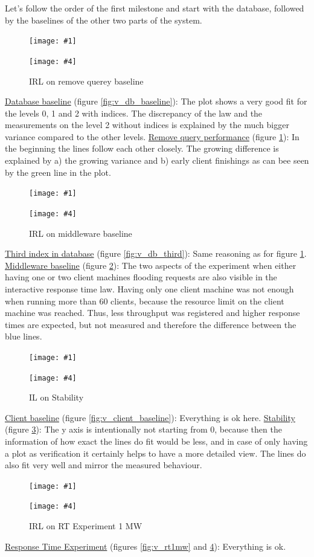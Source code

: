\documentclass[11pt]{article}
\newcommand\TwoFig[6]{%
	\sbox\IBoxA{\texttt{[image: \#1]}}
	\sbox\IBoxB{\texttt{[image: \#4]}}%
	\ifdim\ht\IBoxA>\ht\IBoxB
	\setlength\IHeight{\ht\IBoxB}\else\setlength\IHeight{\ht\IBoxA}\fi%
	\begin{figure}[!htb]
		\minipage[t]{0.5\textwidth}\centering
		\texttt{[image: \#1]}
		\caption{#2}\label{#3}
		\endminipage \hfill
		\minipage[t]{0.5\textwidth}\centering
		\texttt{[image: \#4]}
		\caption{#5}\label{#6}
		\endminipage
	\end{figure}%
}
\begin{document}
Let's follow the order of the first milestone and start with the database, followed by the baselines of the other two parts of the system.
\TwoFig {figures/interactive_law/db_baseline} {IRL on DB baseline} {fig:v_db_baseline}
{figures/interactive_law/db_data_baseline} {IRL on remove querey baseline} {fig:v_db_data}
\newline\underline{Database baseline} (figure \ref{fig:v_db_baseline}): The plot shows a very good fit for the levels 0, 1 and 2 with indices. The discrepancy of the law and the measurements on the level 2 without indices is explained by the much bigger variance compared to the other levels.
\newline\underline{Remove query performance} (figure \ref{fig:v_db_data}): In the beginning the lines follow each other closely. The growing difference is explained by a) the growing variance and b) early client finishings as can bee seen by the green line in the plot.
\TwoFig {figures/interactive_law/db_data_baseline_third_index} {IRL on DB third index} {fig:v_db_third}
		{figures/interactive_law/mw_baseline} {IRL on middleware baseline} {fig:v_mw_baseline}
\newline\underline{Third index in database} (figure \ref{fig:v_db_third}): Same reasoning as for figure \ref{fig:v_db_data}.
\newline\underline{Middleware baseline} (figure \ref{fig:v_mw_baseline}): The two aspects of the experiment when either having one or two client machines flooding requests are also visible in the interactive response time law. Having only one client machine was not enough when running more than 60 clients, because the resource limit on the client machine was reached. Thus, less throughput was registered and higher response times are expected, but not measured and therefore the difference between the blue lines.
\TwoFig {figures/interactive_law/client_baseline} {IL on client baseline} {fig:v_client_baseline}
{figures/interactive_law/stability} {IL on Stability} {fig:v_stability}
\newline\underline{Client baseline} (figure \ref{fig:v_client_baseline}): Everything is ok here.
\newline\underline{Stability} (figure \ref{fig:v_stability}): The y axis is intentionally not starting from 0, because then the information of how exact the lines do fit would be less, and in case of only having a plot as verification it certainly helps to have a more detailed view. The lines do also fit very well and mirror the measured behaviour.
\TwoFig {figures/interactive_law/rt_1cm} {IRL on RT Experiment 1 MW} {fig:v_rt1mw}
{figures/interactive_law/rt_2cm} {IRL on RT Experiment 1 MW} {fig:v_rt2mw}
\newline\underline{Response Time Experiment} (figures \ref{fig:v_rt1mw} and \ref{fig:v_rt2mw}): Everything is ok.
\end{document}
